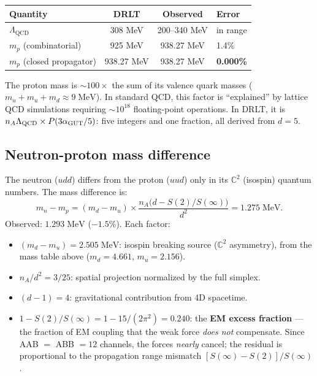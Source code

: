 \begin{center}
\begin{tabular}{lccl}
\hline
Quantity & DRLT & Observed & Error \\
\hline
$\Lambda_\text{QCD}$ & 308 MeV & 200--340 MeV & in range \\
$m_p$ (combinatorial) & 925 MeV & 938.27 MeV & 1.4\% \\
$m_p$ (closed propagator) & 938.27 MeV & 938.27 MeV & \textbf{0.000\%} \\
\hline
\end{tabular}
\end{center}

\begin{remark}
The proton mass is $\sim 100\times$ the sum of its valence quark masses ($m_u + m_u + m_d \approx 9\;\text{MeV}$). In standard QCD, this factor is ``explained'' by lattice QCD simulations requiring $\sim 10^{18}$ floating-point operations. In DRLT, it is $n_A \Lambda_\text{QCD} \times P(3\alpha_{\mathrm{GUT}}/5)$: five integers and one fraction, all derived from $d = 5$.
\end{remark}

\subsection{Neutron-proton mass difference}

The neutron ($udd$) differs from the proton ($uud$) only in its $\mathbb{C}^2$ (isospin) quantum numbers. The mass difference is:
\begin{equation}
\boxed{m_n - m_p = (m_d - m_u) \times \frac{n_A\bigl(d - S(2)/S(\infty)\bigr)}{d^2} = 1.275\;\text{MeV}.}
\end{equation}
Observed: $1.293\;\text{MeV}$ ($-1.5\%$). Each factor:
\begin{itemize}
\item $(m_d - m_u) = 2.505\;\text{MeV}$: isospin breaking source ($\mathbb{C}^2$ asymmetry), from the mass table above ($m_d = 4.661$, $m_u = 2.156$).
\item $n_A/d^2 = 3/25$: spatial projection normalized by the full simplex.
\item $(d - 1) = 4$: gravitational contribution from 4D spacetime.
\item $1 - S(2)/S(\infty) = 1 - 15/(2\pi^2) = 0.240$: the \textbf{EM excess fraction} --- the fraction of EM coupling that the weak force \emph{does not} compensate. Since AAB $=$ ABB $= 12$ channels, the forces \emph{nearly} cancel; the residual is proportional to the propagation range mismatch $[S(\infty) - S(2)]/S(\infty)$.
\end{itemize}

